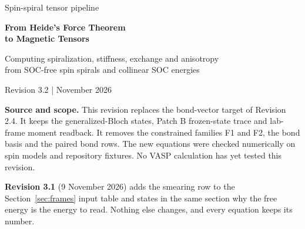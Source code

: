 \documentclass[11pt,a4paper]{article}
\numberwithin{equation}{section}
\begin{document}
\hypersetup{pageanchor=false}
\begin{titlepage}
\vspace*{15mm}
{\large Spin-spiral tensor pipeline\par}
\vspace{12mm}
{\LARGE\bfseries From Heide's Force Theorem\\[3pt] to Magnetic Tensors\par}
\vspace{8mm}
{\large Computing spiralization, stiffness, exchange and anisotropy\\
from SOC-free spin spirals and collinear SOC energies\par}
\vspace{10mm}
{\large Revision 3.2 \quad |  November 2026\par}
\vspace{13mm}
\begin{abstract}
\noindent
The calculation has four parts. First, VASP prepares an unconstrained
SOC-free flat spin spiral for a chosen magnetic pattern. Second, a
frozen-state PAW trace gives its first-order spin--orbit energy, as a vector
with one component per Cartesian axis. Third, symmetry fixes which tensor
components are allowed and which $q$ points are needed. Fourth, small linear
fits turn traces and total energies into the spiralization tensor, the
stiffness tensor and exchange classes.

This document derives what the code needs for those steps and nothing more.
The tensors are long-wavelength sums of the bond interactions, so they avoid
the bond-resolution limit of flat spirals. They then give predictions such as
the spiral period, spin plane and texture class. Anisotropy is a separate
calculation on collinear states, described in Section~\ref{sec:mca}.
\end{abstract}
\vfill
\textbf{Source and scope.} This revision replaces the bond-vector target of
Revision 2.4. It keeps the generalized-Bloch states, Patch B frozen-state
trace and lab-frame moment readback. It removes the constrained families F1 and
F2, the bond basis and the paired bond rows. The new equations were checked
numerically on spin models and repository fixtures. No VASP calculation has
yet tested this revision.

\textbf{Revision 3.1} (9 November 2026) adds the smearing row to the
Section~\ref{sec:frames} input table and states in the same section why the
free energy is the energy to read. Nothing else changes, and every equation
keeps its number.


\end{titlepage}
\end{document}
